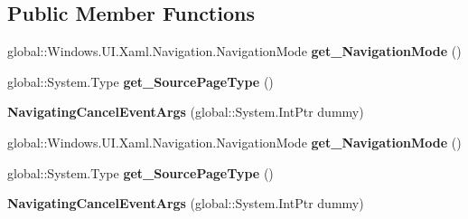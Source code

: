 \subsection*{Public Member Functions}
\begin{DoxyCompactItemize}
\item 
\mbox{\label{class_windows_1_1_u_i_1_1_xaml_1_1_navigation_1_1_navigating_cancel_event_args_ad17e36a7ec78b433e37ed67a3b93decb}} 
global\+::\+Windows.\+U\+I.\+Xaml.\+Navigation.\+Navigation\+Mode {\bfseries get\+\_\+\+Navigation\+Mode} ()
\item 
\mbox{\label{class_windows_1_1_u_i_1_1_xaml_1_1_navigation_1_1_navigating_cancel_event_args_ae97b1c383ee491650382b71c20b3995f}} 
global\+::\+System.\+Type {\bfseries get\+\_\+\+Source\+Page\+Type} ()
\item 
\mbox{\label{class_windows_1_1_u_i_1_1_xaml_1_1_navigation_1_1_navigating_cancel_event_args_a453487078d7857bf5f014fc99fddf8eb}} 
{\bfseries Navigating\+Cancel\+Event\+Args} (global\+::\+System.\+Int\+Ptr dummy)
\item 
\mbox{\label{class_windows_1_1_u_i_1_1_xaml_1_1_navigation_1_1_navigating_cancel_event_args_ad17e36a7ec78b433e37ed67a3b93decb}} 
global\+::\+Windows.\+U\+I.\+Xaml.\+Navigation.\+Navigation\+Mode {\bfseries get\+\_\+\+Navigation\+Mode} ()
\item 
\mbox{\label{class_windows_1_1_u_i_1_1_xaml_1_1_navigation_1_1_navigating_cancel_event_args_ae97b1c383ee491650382b71c20b3995f}} 
global\+::\+System.\+Type {\bfseries get\+\_\+\+Source\+Page\+Type} ()
\item 
\mbox{\label{class_windows_1_1_u_i_1_1_xaml_1_1_navigation_1_1_navigating_cancel_event_args_a453487078d7857bf5f014fc99fddf8eb}} 
{\bfseries Navigating\+Cancel\+Event\+Args} (global\+::\+System.\+Int\+Ptr dummy)

\end{DoxyCompactItemize}
